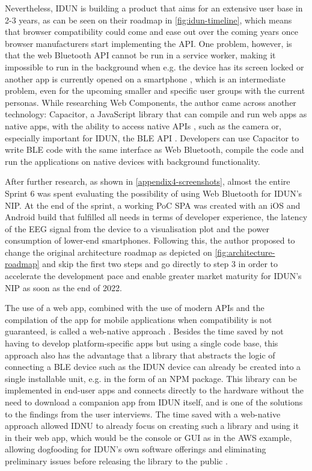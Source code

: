 Nevertheless, IDUN is building a product that aims for an extensive user base in 2-3 years, as can be seen on their roadmap in \autoref{fig:idun-timeline}, which means that browser compatibility could come and ease out over the coming years once browser manufacturers start implementing the API. One problem, however, is that the web Bluetooth API cannot be run in a service worker, making it impossible to run in the background when e.g. the device has its screen locked or another app is currently opened on a smartphone \citep{webbluetoothcg_service_2018}, which is an intermediate problem, even for the upcoming smaller and specific user groups with the current personas. While researching Web Components, the author came across another technology: Capacitor, a JavaScript library that can compile and run web apps as native apps, with the ability to access native APIs \citep{ionic_capacitor_nodate}, such as the camera or, especially important for IDUN, the BLE API \citep{capacitor-community_capacitor-communitybluetooth-_2022}. Developers can use Capacitor to write BLE code with the same interface as Web Bluetooth, compile the code and run the applications on native devices with background functionality.

After further research, as shown in \autoref{appendix4-screenshots}, almost the entire Sprint 6 was spent evaluating the possibility of using Web Bluetooth for IDUN's NIP. At the end of the sprint, a working PoC SPA was created with an iOS and Android build that fulfilled all needs in terms of developer experience, the latency of the EEG signal from the device to a visualisation plot and the power consumption of lower-end smartphones. Following this, the author proposed to change the original architecture roadmap as depicted on \autoref{fig:architecture-roadmap} and skip the first two steps and go directly to step 3 in order to accelerate the development pace and enable greater market maturity for IDUN's NIP as soon as the end of 2022.

The use of a web app, combined with the use of modern APIs and the compilation of the app for mobile applications when compatibility is not guaranteed, is called a web-native approach \citep{ionic_web_nodate}. Besides the time saved by not having to develop platform-specific apps but using a single code base, this approach also has the advantage that a library that abstracts the logic of connecting a BLE device such as the IDUN device can already be created into a single installable unit, e.g. in the form of an NPM package. This library can be implemented in end-user apps and connects directly to the hardware without the need to download a companion app from IDUN itself, and is one of the solutions to the findings from the user interviews. The time saved with a web-native approach allowed IDNU to already focus on creating such a library and using it in their web app, which would be the console or GUI as in the AWS example, allowing dogfooding for IDUN's own software offerings and eliminating preliminary issues before releasing the library to the public \citep{techopedia_what_2016}.

